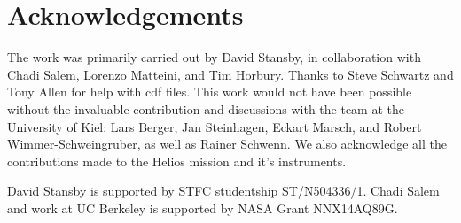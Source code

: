 \documentclass[11pt,a4paper]{article}
\begin{document}
\section{Acknowledgements}
The work was primarily carried out by David Stansby, in collaboration with Chadi Salem, Lorenzo Matteini, and Tim Horbury. Thanks to Steve Schwartz and Tony Allen for help with cdf files. This work would not have been possible without the invaluable contribution and discussions with the team at the University of Kiel: Lars Berger, Jan Steinhagen, Eckart Marsch, and Robert Wimmer-Schweingruber, as well as Rainer Schwenn. We also acknowledge all the contributions made to the Helios mission and it's instruments.

David Stansby is supported by STFC studentship ST/N504336/1. Chadi Salem and work at UC Berkeley is supported by NASA Grant NNX14AQ89G. 
\end{document}
